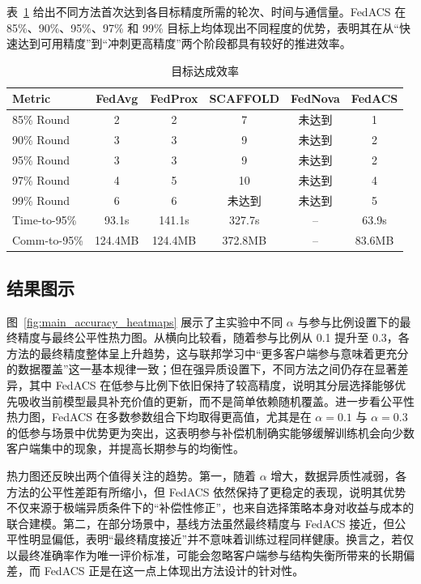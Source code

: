 \documentclass[UTF8,11pt]{ctexart}
\begin{document}
表~\ref{tab:targets_transposed} 给出不同方法首次达到各目标精度所需的轮次、时间与通信量。FedACS 在 85\%、90\%、95\%、97\% 和 99\% 目标上均体现出不同程度的优势，表明其在从“快速达到可用精度”到“冲刺更高精度”两个阶段都具有较好的推进效率。

\begin{table}[H]
\centering
\caption{目标达成效率}
\label{tab:targets_transposed}
\small
\setlength{\tabcolsep}{4pt}
\begin{tabular}{lccccc}
\toprule
Metric & FedAvg & FedProx & SCAFFOLD & FedNova & FedACS \\
\midrule
85\% Round    & 2 & 2 & 7 & 未达到 & 1 \\
90\% Round    & 3 & 3 & 9 & 未达到 & 2 \\
95\% Round    & 3 & 3 & 9 & 未达到 & 2 \\
97\% Round    & 4 & 5 & 10 & 未达到 & 4 \\
99\% Round    & 6 & 6 & 未达到 & 未达到 & 5 \\
Time-to-95\%  & 93.1s & 141.1s & 327.7s & -- & 63.9s \\
Comm-to-95\%  & 124.4MB & 124.4MB & 372.8MB & -- & 83.6MB \\
\bottomrule
\end{tabular}
\end{table}

\subsection{结果图示}
图~\ref{fig:main_accuracy_heatmaps} 展示了主实验中不同 $\alpha$ 与参与比例设置下的最终精度与最终公平性热力图。从横向比较看，随着参与比例从 0.1 提升至 0.3，各方法的最终精度整体呈上升趋势，这与联邦学习中“更多客户端参与意味着更充分的数据覆盖”这一基本规律一致；但在强异质设置下，不同方法之间仍存在显著差异，其中 FedACS 在低参与比例下依旧保持了较高精度，说明其分层选择能够优先吸收当前模型最具补充价值的更新，而不是简单依赖随机覆盖。进一步看公平性热力图，FedACS 在多数参数组合下均取得更高值，尤其是在 $\alpha=0.1$ 与 $\alpha=0.3$ 的低参与场景中优势更为突出，这表明参与补偿机制确实能够缓解训练机会向少数客户端集中的现象，并提高长期参与的均衡性。

热力图还反映出两个值得关注的趋势。第一，随着 $\alpha$ 增大，数据异质性减弱，各方法的公平性差距有所缩小，但 FedACS 依然保持了更稳定的表现，说明其优势不仅来源于极端异质条件下的“补偿性修正”，也来自选择策略本身对收益与成本的联合建模。第二，在部分场景中，基线方法虽然最终精度与 FedACS 接近，但公平性明显偏低，表明“最终精度接近”并不意味着训练过程同样健康。换言之，若仅以最终准确率作为唯一评价标准，可能会忽略客户端参与结构失衡所带来的长期偏差，而 FedACS 正是在这一点上体现出方法设计的针对性。
\end{document}
